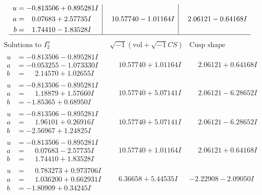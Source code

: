 \documentclass[1p]{elsarticle_modified}
\theoremstyle{definition}
\newcommand{\I}{\sqrt{-1}}
\begin{document}
$$\begin{array}{c|c|c}
\begin{aligned}
u &= -0.813506 + 0.895281 I \\
a &= \phantom{-}0.07683 + 2.57735 I \\
b &= \phantom{-}1.74410 - 1.83528 I\end{aligned}
 & \phantom{-}10.57740 - 1.01164 I & \phantom{-}2.06121 - 0.64168 I\\
 \hline 
 \end{array}$$\newpage$$\begin{array}{c|c|c}  
\text{Solutions to }I^u_{2}& \I (\text{vol} + \sqrt{-1}CS) & \text{Cusp shape}\\
 \hline 
\begin{aligned}
u &= -0.813506 - 0.895281 I \\
a &= -0.053255 - 1.073330 I \\
b &= \phantom{-}2.14570 + 1.02655 I\end{aligned}
 & \phantom{-}10.57740 + 1.01164 I & \phantom{-}2.06121 + 0.64168 I \\ \hline\begin{aligned}
u &= -0.813506 - 0.895281 I \\
a &= \phantom{-}1.18879 + 1.57660 I \\
b &= -1.85365 + 0.68950 I\end{aligned}
 & \phantom{-}10.57740 + 5.07141 I & \phantom{-}2.06121 - 6.28652 I \\ \hline\begin{aligned}
u &= -0.813506 - 0.895281 I \\
a &= \phantom{-}1.96101 + 0.26916 I \\
b &= -2.56967 + 1.24825 I\end{aligned}
 & \phantom{-}10.57740 + 5.07141 I & \phantom{-}2.06121 - 6.28652 I \\ \hline\begin{aligned}
u &= -0.813506 - 0.895281 I \\
a &= \phantom{-}0.07683 - 2.57735 I \\
b &= \phantom{-}1.74410 + 1.83528 I\end{aligned}
 & \phantom{-}10.57740 + 1.01164 I & \phantom{-}2.06121 + 0.64168 I \\ \hline\begin{aligned}
u &= \phantom{-}0.783273 + 0.973706 I \\
a &= \phantom{-}1.036200 + 0.662931 I \\
b &= -1.80909 + 0.34245 I\end{aligned}
 & \phantom{-}6.36658 + 5.44535 I & -2.22908 - 2.09050 I \\ \hline\begin{aligned}

\end{aligned}
\end{array}$$
\end{document}
